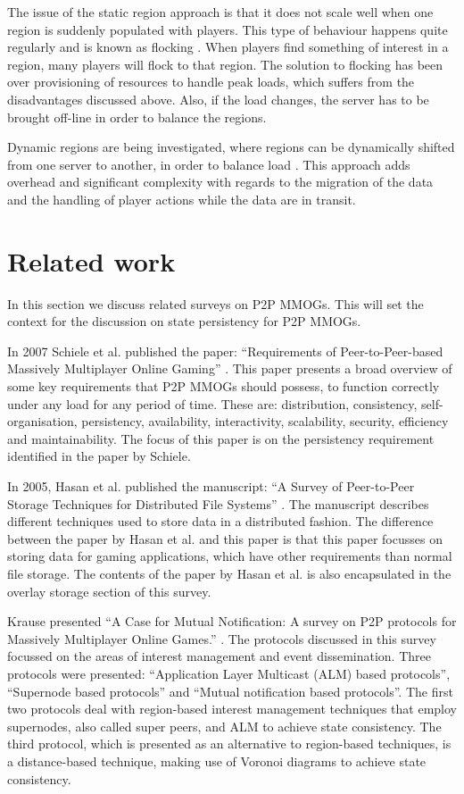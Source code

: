 \documentclass[10pt,a4paper,journal,cspaper,compsoc]{IEEEtran}
\begin{document}
The issue of the static region approach is that it does not scale well when one region is suddenly populated with players. This type of behaviour
happens quite regularly and is known as flocking \cite{flocking}. When players find something of interest in a region, many players will flock to
that region. The solution to flocking has been over provisioning of resources to handle peak loads, which suffers from the disadvantages discussed
above. Also, if the load changes, the server has to be brought off-line in order to balance the regions.

Dynamic regions are being investigated, where regions can be dynamically shifted from one server to another, in order to balance load
\cite{zone_based_dyn}. This approach adds overhead and significant complexity with regards to the migration of the data and the handling of player
actions while the data are in transit.

\section{Related work}
\label{related_work}

In this section we discuss related surveys on P2P MMOGs. This will set the context for the discussion on state persistency for P2P MMOGs.

In 2007 Schiele et al. published the paper: ``Requirements of Peer-to-Peer-based Massively Multiplayer Online Gaming''
\cite{Schiele_p2p_requirements}. This paper presents a broad overview of some key requirements that P2P MMOGs should possess, to function correctly
under any load for any period of time. These are: distribution, consistency, self-organisation, persistency, availability, interactivity,
scalability, security, efficiency and maintainability. The focus of this paper is on the persistency requirement identified in the paper by Schiele.

In 2005, Hasan et al. published the manuscript: ``A Survey of Peer-to-Peer Storage Techniques for Distributed File Systems''
\cite{Hasan_distributed_storage_survey}. The manuscript describes different techniques used to store data in a distributed fashion. The difference
between the paper by Hasan et al. and this paper is that this paper focusses on storing data for gaming applications, which have other requirements
than normal file storage. The contents of the paper by Hasan et al. is also encapsulated in the overlay storage section of this survey.

Krause presented ``A Case for Mutual Notification: A survey on P2P protocols for Massively Multiplayer Online Games.''
\cite{IM_and_ED_survey_Krause}. The protocols discussed in this survey focussed on the areas of interest management and event dissemination. Three
protocols were presented: ``Application Layer Multicast (ALM) based protocols'', ``Supernode based protocols'' and ``Mutual notification based
protocols''. The first two protocols deal with region-based interest management techniques that employ supernodes, also called super peers, and ALM
to achieve state consistency. The third protocol, which is presented as an alternative to region-based techniques, is a distance-based technique,
making use of Voronoi diagrams to achieve state consistency.
\end{document}
